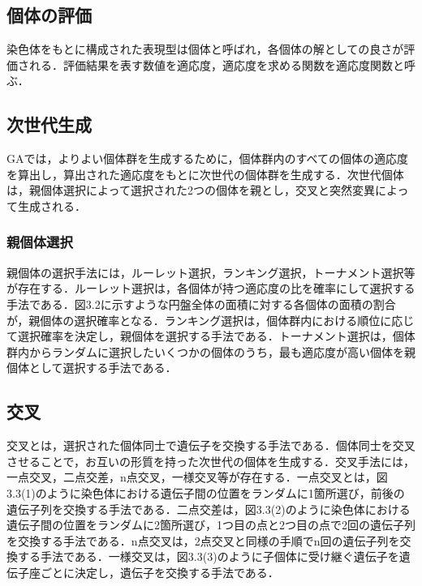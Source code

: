 \subsection{個体の評価}
染色体をもとに構成された表現型は個体と呼ばれ，各個体の解としての良さが評価される．評価結果を表す数値を適応度，適応度を求める関数を適応度関数と呼ぶ．

\subsection{次世代生成}
GAでは，よりよい個体群を生成するために，個体群内のすべての個体の適応度を算出し，算出された適応度をもとに次世代の個体群を生成する．次世代個体は，親個体選択によって選択された2つの個体を親とし，交叉と突然変異によって生成される．

\subsubsection{親個体選択}
親個体の選択手法には，ルーレット選択，ランキング選択，トーナメント選択等が存在する．ルーレット選択は，各個体が持つ適応度の比を確率にして選択する手法である．図3.2に示すような円盤全体の面積に対する各個体の面積の割合が，親個体の選択確率となる．ランキング選択は，個体群内における順位に応じて選択確率を決定し，親個体を選択する手法である．トーナメント選択は，個体群内からランダムに選択したいくつかの個体のうち，最も適応度が高い個体を親個体として選択する手法である．

\subsection{交叉}
交叉とは，選択された個体同士で遺伝子を交換する手法である．個体同士を交叉させることで，お互いの形質を持った次世代の個体を生成する．交叉手法には，一点交叉，二点交差，n点交叉，一様交叉等が存在する．一点交叉とは，図3.3(1)のように染色体における遺伝子間の位置をランダムに1箇所選び，前後の遺伝子列を交換する手法である．二点交差は，図3.3(2)のように染色体における遺伝子間の位置をランダムに2箇所選び，1つ目の点と2つ目の点で2回の遺伝子列を交換する手法である．n点交叉は，2点交叉と同様の手順でn回の遺伝子列を交換する手法である．一様交叉は，図3.3(3)のように子個体に受け継ぐ遺伝子を遺伝子座ごとに決定し，遺伝子を交換する手法である．

